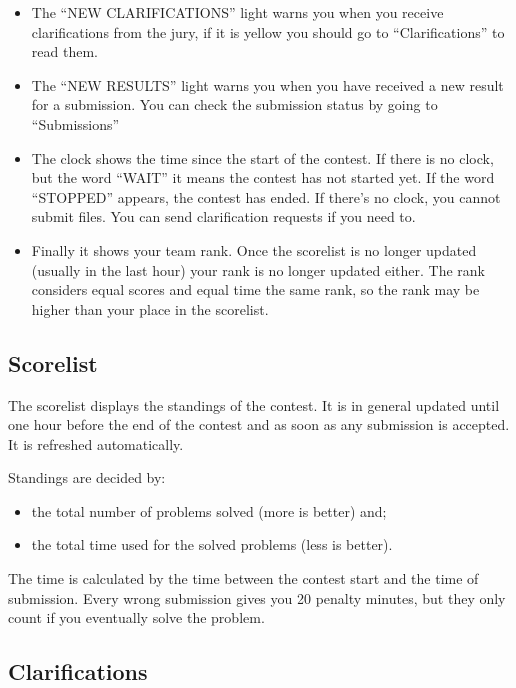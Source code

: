 \documentclass[a4paper]{artikel3}
\begin{document}
\begin{itemize}
\item The ``NEW CLARIFICATIONS'' light warns you when you receive
clarifications from the jury, if it is yellow you should go to
``Clarifications'' to read them.

\item The ``NEW RESULTS'' light warns you when you have received a new result
for a submission. You can check the submission status by going to
``Submissions''

\item The clock shows the time since the start of the contest. If there is
no clock, but the word ``WAIT'' it means the contest has not started yet. If
the word ``STOPPED'' appears, the contest has ended. If there's no clock, you
cannot submit files. You can send clarification requests if you need to.

\item Finally it shows your team rank. Once the scorelist is no longer
updated (usually in the last hour) your rank is no longer updated either.
The rank considers equal scores and equal time the same rank, so the rank
may be higher than your place in the scorelist.

\end{itemize}

\subsection{Scorelist}

The scorelist displays the standings of the contest. It is in general
updated until one hour before the end of the contest and as soon as any
submission is accepted. It is refreshed automatically.

Standings are decided by:

\begin{itemize}
\item the total number of problems solved (more is better) and;
\item the total time used for the solved problems (less is better).
\end{itemize}

The time is calculated by the time between the contest start and the time of
submission. Every wrong submission gives you 20 penalty minutes, but they
only count if you eventually solve the problem.

\subsection{Clarifications}
\end{document}
